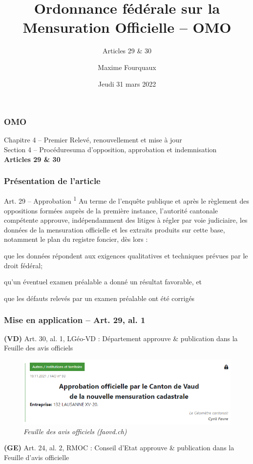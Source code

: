 \documentclass{beamer}
\title{Ordonnance fédérale sur la Mensuration Officielle -- OMO}
\subtitle{Articles 29 \& 30}
\author{Maxime Fourquaux}
\institute[HEIG]%
{
    HEIG-VD  -- EC+G \\
    Orientation GGT
}
\date{Jeudi 31 mars 2022}
\renewcommand{\up}[1]{\textsuperscript{#1}}
\begin{document}
\frame{\titlepage}

\begin{frame}
    \frametitle{OMO}
    Chapitre 4 -- Premier Relevé, renouvellement et mise à jour \\
    \bigskip
    Section 4 -- Procéduresuma d'opposition, approbation et indemnisation \\
    \bigskip
    \textbf{Articles 29 \& 30}
\end{frame}

\begin{frame}
    \frametitle{Présentation de l'article}
    \begin{alertblock}{Art. 29 -- Approbation}
        \up{1} Au terme de l’enquête publique et après le règlement des oppositions formées auprès de la première instance, \alert{l’autorité cantonale compétente approuve}, indépendamment des litiges à régler par voie judiciaire, \alert {les données de la mensuration officielle} et les extraits produits sur cette base, notamment le plan du registre foncier, dès lors : \pause
        \begin{outline}
            \item que les données répondent aux exigences qualitatives et techniques prévues par le droit fédéral; \pause
            \item qu’un éventuel examen préalable a donné un résultat favorable, et \pause
            \item que les défauts relevés par un examen préalable ont été corrigés
        \end{outline}
    \end{alertblock}
\end{frame}

\begin{frame}
    \frametitle{Mise en application -- Art. 29, al. 1}
    \textbf{(VD)} Art. 30, al. 1, LGéo-VD : Département approuve \& publication dans la Feuille des avis officiels
    \bigskip
    \begin{figure}
        \centering
        \includegraphics[scale=0.5]{picture/132LausanneApprobationOfficielleMensuration.png}
        \textit{Feuille des avis officiels (faovd.ch)}
    \end{figure} \pause
    \textbf{(GE)} Art. 24, al. 2, RMOC : Conseil d'Etat approuve \& publication dans la Feuille d'avis officielle
\end{frame}
\end{document}
